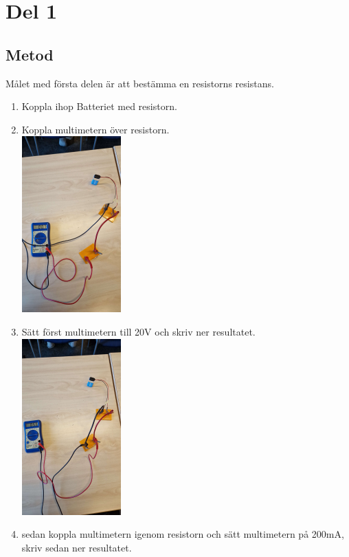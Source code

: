 \documentclass[11p]{article}
\begin{document}
    \section{Del 1}
    \subsection{Metod}
    Målet med första delen är att bestämma en resistorns resistans.

    \begin{enumerate}
        \item Koppla ihop Batteriet med resistorn.
        \item Koppla multimetern över resistorn.
        \\
        \includegraphics[width=0.3\textwidth]{images/1Volt.jpg}
        \item Sätt först multimetern till 20V och skriv ner resultatet.
        \\
        \includegraphics[width=0.3\textwidth]{images/1Ampere.jpg}
        \item sedan koppla multimetern igenom resistorn och sätt multimetern på 200mA, skriv sedan ner resultatet.
    \end{enumerate}
\end{document}

